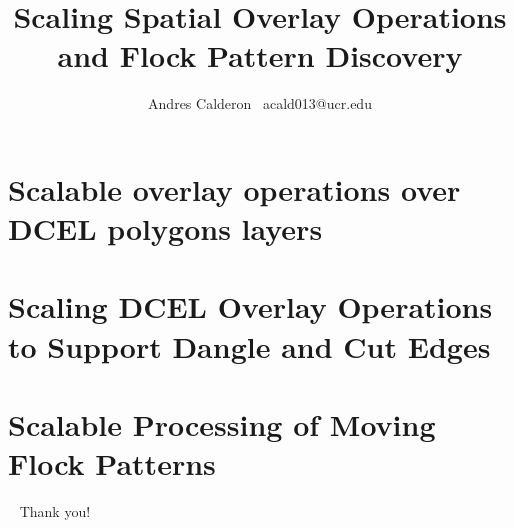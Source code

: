\documentclass{beamer}
\title{\LARGE Scaling Spatial Overlay Operations and Flock Pattern Discovery}
\subtitle{}
\author{
    Andres Calderon \textperiodcentered \ acald013@ucr.edu \\
}
\institute{University of California, Riverside}
\begin{document}
    \begin{frame}
        \maketitle
    \end{frame}

    \section{Scalable overlay operations over DCEL polygons layers}



    \section{Scaling DCEL Overlay Operations to Support Dangle and Cut Edges}



    \section{Scalable Processing of Moving Flock Patterns}



    \begin{frame}{ \ }
        \LARGE Thank you!
    \end{frame}
\end{document}
